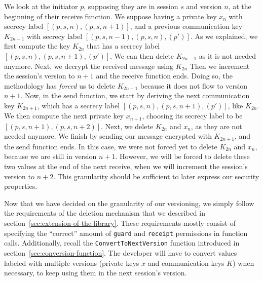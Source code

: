 We look at the initiator $p$, supposing they are in session $s$ and version $n$, at the beginning of their receive function. We suppose having a private key $x_{n}$ with secrecy label $[(p,s,n),(p,s,n+1)]$, and a previous communication key $K_{2n-1}$ with secrecy label $[(p,s,n-1),(p,s,n),(p')]$.
As we explained, we first compute the key $K_{2n}$ that has a secrecy label $[(p,s,n),(p,s,n+1),(p')]$.
We can then delete $K_{2n-1}$ as it is not needed anymore.
Next, we decrypt the received message using $K_{2n}$
Then we increment the session's version to $n+1$ and the receive function ends.
Doing so, the methodology has \emph{forced} us to delete $K_{2n-1}$ because it does not flow to version $n+1$.
Now, in the send function, we start by deriving the next communication key $K_{2n+1}$, which has a secrecy label $[(p,s,n),(p,s,n+1),(p')]$, like $K_{2n}$.
We then compute the next private key $x_{n+1}$, choosing its secrecy label to be $[(p,s,n+1),(p,s,n+2)]$.
Next, we delete $K_{2n}$ and $x_{n}$, as they are not needed anymore.
We finish by sending our message encrypted with $K_{2n+1}$, and the send function ends.
In this case, we were not forced yet to delete $K_{2n}$ and $x_{n}$, because we are still in version $n+1$.
However, we will be forced to delete these two values at the end of the next receive, when we will increment the session's version to $n+2$.
This granularity should be sufficient to later express our security properties.

Now that we have decided on the granularity of our versioning, we simply follow the requirements of the deletion mechanism that we described in section~\ref{sec:extension-of-the-library}.
These requirements mostly consist of specifying the “correct” amount of \texttt{guard} and \texttt{receipt} permissions in function calls. 
Additionally, recall the \texttt{ConvertToNextVersion} function introduced in section~\ref{sec:conversion-function}.
The developer will have to convert values labeled with multiple versions (private keys $x$ and communication keys $K$) when necessary, to keep using them in the next session's version.

